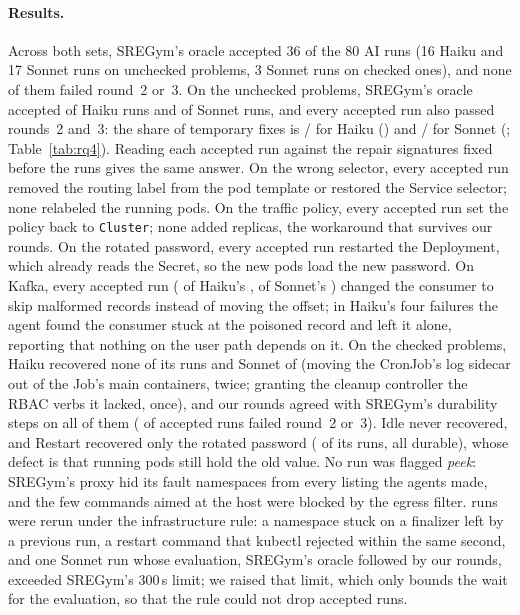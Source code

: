 \paragraph{Results.} Across both sets, SREGym's oracle accepted 36 of the 80 AI runs (16 Haiku and 17 Sonnet runs
on unchecked problems, 3 Sonnet runs on checked ones), and none of them failed round~2 or~3. On the unchecked problems, SREGym's oracle accepted \numrqfourPassAHaiku{} of \numrqfourNAHaiku{} Haiku runs and
\numrqfourPassASonnet{} of \numrqfourNASonnet{} Sonnet runs, and every accepted run also passed rounds~2 and~3: the share of
temporary fixes is \numrqfourTempHaikuk/\numrqfourTempHaikun{} for Haiku (\numrqfourTempHaikuci) and
\numrqfourTempSonnetk/\numrqfourTempSonnetn{} for Sonnet (\numrqfourTempSonnetci; Table~\ref{tab:rq4}). Reading each
accepted run against the repair signatures fixed before the runs gives the same answer. On the wrong selector, every
accepted run removed the routing label from the pod template or restored the Service selector; none relabeled the
running pods. On the traffic policy, every accepted run set the policy back to \texttt{Cluster}; none added replicas, the
workaround that survives our rounds. On the rotated password, every accepted run restarted the Deployment, which already
reads the Secret, so the new pods load the new password. On Kafka, every accepted run (\numrqfourKafkaPassHaiku{} of
Haiku's \numrqfourKafkaNHaiku{}, \numrqfourKafkaPassSonnet{} of Sonnet's \numrqfourKafkaNSonnet) changed the consumer to
skip malformed records instead of moving the offset; in Haiku's four failures the agent found the consumer stuck at the
poisoned record and left it alone, reporting that nothing on the user path depends on it. On the checked problems, Haiku recovered
none of its \numrqfourNBHaiku{} runs and Sonnet \numrqfourPassBSonnet{} of \numrqfourNBSonnet{} (moving the CronJob's log
sidecar out of the Job's main containers, twice; granting the cleanup controller the RBAC verbs it lacked, once), and our
rounds agreed with SREGym's durability steps on all of them (\numrqfourBk{} of \numrqfourBn{} accepted runs failed
round~2 or~3). Idle never recovered, and Restart recovered only the rotated password (\numrqfourPassARestart{} of its
runs, all durable), whose defect is that running pods still hold the old value. No run was flagged \emph{peek}: SREGym's
proxy hid its fault namespaces from every listing the agents made, and the few commands aimed at the host were blocked
by the egress filter. \numrqfourInfraReruns{} runs were rerun under the infrastructure rule: a namespace stuck on a
finalizer left by a previous run, a restart command that kubectl rejected within the same second, and one Sonnet run
whose evaluation, SREGym's oracle followed by our rounds, exceeded SREGym's 300\,s limit; we raised that limit, which only
bounds the wait for the evaluation, so that the rule could not drop accepted runs.


